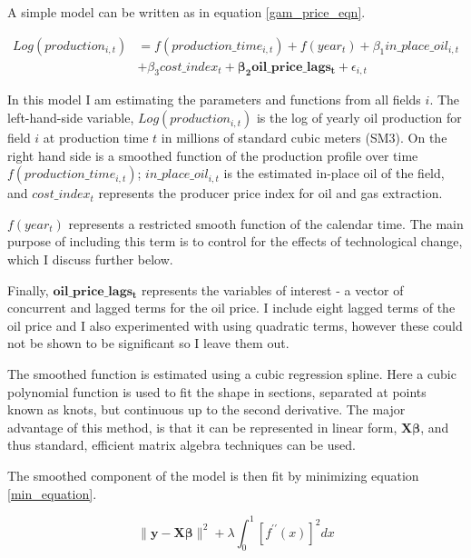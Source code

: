 \documentclass[11pt]{article}
\begin{document}
A simple model can be written as in equation \ref{gam_price_eqn}. 

\begin{equation}
\begin{split}
	Log(production_{i,t}) & = f(production\_time_{i,t}) + f(year_t) + \beta_1 in\_place\_oil_{i,t}\\
	 \quad & + \beta_3 cost\_index_{t} + \mathbf{\beta_2 oil\_price\_lags_t} +  
	  \epsilon_{i,t}
\label{gam_price_eqn}
\end{split}
\end{equation}

In this model I am estimating the parameters and functions from all fields $i$. The left-hand-side variable, $Log(production_{i,t})$ is the log of yearly oil production for field $i$ at production time $t$ in millions of standard cubic meters (SM3).  On the right hand side is a smoothed function of the production profile over time $f(production\_time_{i,t})$; $in\_place\_oil_{i,t}$ is the estimated in-place oil of the field, and $cost\_index_{t}$ represents the producer price index for oil and gas extraction. 

$f(year_t)$ represents a restricted smooth function of the calendar time.  The main purpose of including this term is to control for the effects of technological change, which I discuss further below.

Finally, $\mathbf{oil\_price\_lags_t}$ represents the variables of interest - a vector of concurrent and lagged terms for the oil price. I include eight lagged terms of the oil price and I also experimented with using quadratic terms, however these could not be shown to be significant so I leave them out. 

The smoothed function is estimated using a cubic regression spline. Here a cubic polynomial function is used to fit the shape in sections, separated at points known as knots, but continuous up to the second derivative.  The major advantage of this method, is that it can be represented in linear form, $\boldsymbol{X \beta} $, and thus standard, efficient matrix algebra techniques can be used.  

The smoothed component of the model is then fit by minimizing equation \ref{min_equation}.

\begin{equation}
\| \mathbf{y} - \mathbf{X\beta} \| ^2 + \lambda \int_{0}^{1} [f^{\prime \prime}(x)]^2 dx
\label{min_equation}
\end{equation}
\end{document}
